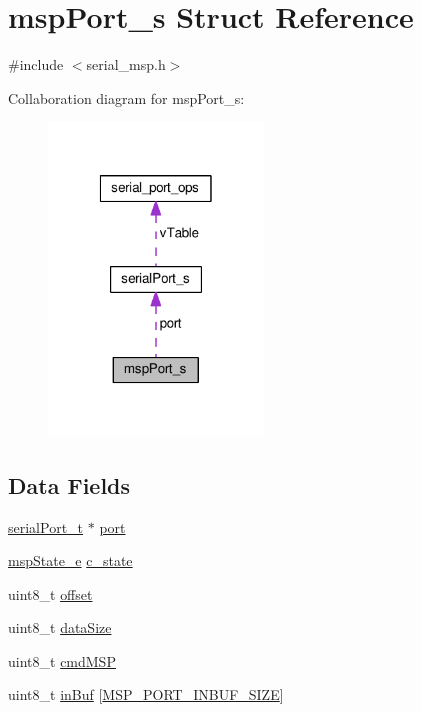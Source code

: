\hypertarget{structmspPort__s}{\section{msp\+Port\+\_\+s Struct Reference}
\label{structmspPort__s}
}


{\ttfamily \#include $<$serial\+\_\+msp.\+h$>$}



Collaboration diagram for msp\+Port\+\_\+s\+:\nopagebreak
\begin{figure}[H]
\begin{center}
\leavevmode
\includegraphics[width=162pt]{structmspPort__s__coll__graph}
\end{center}
\end{figure}
\subsection*{Data Fields}
\begin{DoxyCompactItemize}
\item 
\hyperlink{drivers_2serial_8h_a64a5e2f04e1a908fbb1b3b165f88e0ef}{serial\+Port\+\_\+t} $\ast$ \hyperlink{structmspPort__s_a561c20f90ff842dbd8a4f75602517a88}{port}
\item 
\hyperlink{serial__msp_8h_aa61e8d673dede45bd0e23ab09c14aba5}{msp\+State\+\_\+e} \hyperlink{structmspPort__s_aec5dc10b05ca82165f879c4191bd38a0}{c\+\_\+state}
\item 
uint8\+\_\+t \hyperlink{structmspPort__s_ad854fa5f09a8e9e9fba287179d8fa033}{offset}
\item 
uint8\+\_\+t \hyperlink{structmspPort__s_a7efe988247e57e9d15ad44eaaf6895e4}{data\+Size}
\item 
uint8\+\_\+t \hyperlink{structmspPort__s_a8ab638ef0b8106954eaaad5542d77f41}{cmd\+M\+S\+P}
\item 
uint8\+\_\+t \hyperlink{structmspPort__s_ab1b861f2214f7c49dd1b4fbc6f4daf11}{in\+Buf} \mbox{[}\hyperlink{serial__msp_8h_a0965abdf6d185e1c33d6a36e2e0f80c0}{M\+S\+P\+\_\+\+P\+O\+R\+T\+\_\+\+I\+N\+B\+U\+F\+\_\+\+S\+I\+Z\+E}\mbox{]}
\end{DoxyCompactItemize}


